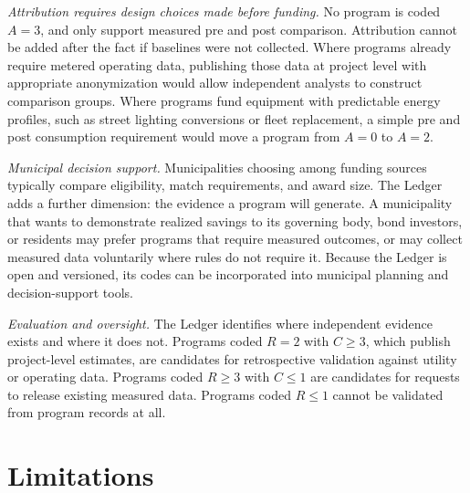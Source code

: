\documentclass[10pt,twocolumn,letterpaper]{article}
\begin{document}
\textit{Attribution requires design choices made before funding.} No program is coded $A = 3$, and only \nAtwo{} support measured pre and post comparison. Attribution cannot be added after the fact if baselines were not collected. Where programs already require metered operating data, publishing those data at project level with appropriate anonymization would allow independent analysts to construct comparison groups. Where programs fund equipment with predictable energy profiles, such as street lighting conversions or fleet replacement, a simple pre and post consumption requirement would move a program from $A = 0$ to $A = 2$.

\textit{Municipal decision support.} Municipalities choosing among funding sources typically compare eligibility, match requirements, and award size. The Ledger adds a further dimension: the evidence a program will generate. A municipality that wants to demonstrate realized savings to its governing body, bond investors, or residents may prefer programs that require measured outcomes, or may collect measured data voluntarily where rules do not require it. Because the Ledger is open and versioned, its codes can be incorporated into municipal planning and decision-support tools.

\textit{Evaluation and oversight.} The Ledger identifies where independent evidence exists and where it does not. Programs coded $R = 2$ with $C \ge 3$, which publish project-level estimates, are candidates for retrospective validation against utility or operating data. Programs coded $R \ge 3$ with $C \le 1$ are candidates for requests to release existing measured data. Programs coded $R \le 1$ cannot be validated from program records at all.

\section{Limitations}\label{sec:limits}
\end{document}

